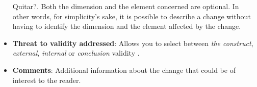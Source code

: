 \begin{itemize}
\begin{itemize}
\end{itemize}
\textcolor[rgb]{1,0,0}{Quitar?}.  Both the dimension and the element concerned are optional. 
In other words, for simplicity's sake, it is possible to describe a change without having to identify the dimension and the element affected by the change.
\item \textbf {Threat to validity addressed}: Allows you to select between \textit{the construct}, \textit{external}, \textit{internal} or \textit{conclusion} validity \cite{wohlin:experimentation}.
\item \textbf {Comments}: Additional information about the change that could be of interest to the reader.

 \end{itemize}
 






 

